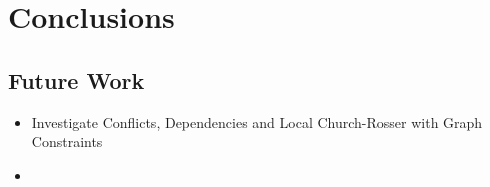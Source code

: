 \chapter{Conclusions}

\section{Future Work}

\begin{itemize}
  \item Investigate Conflicts, Dependencies and Local Church-Rosser with Graph Constraints
  \item 
\end{itemize}
